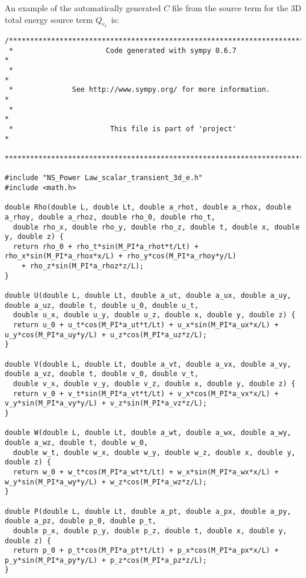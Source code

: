 \documentclass[10pt]{article}
\begin{document}
An example of the automatically generated $C$ file from the source term for the 3D total energy source term $Q_{e_t}$~is:

\begin{footnotesize}
\begin{verbatim}
/****************************************************************************** 
 *                      Code generated with sympy 0.6.7                       * 
 *                                                                            * 
 *              See http://www.sympy.org/ for more information.               * 
 *                                                                            * 
 *                       This file is part of 'project'                       * 
 ******************************************************************************/

#include "NS_Power Law_scalar_transient_3d_e.h"
#include <math.h>

double Rho(double L, double Lt, double a_rhot, double a_rhox, double a_rhoy, double a_rhoz, double rho_0, double rho_t, 
  double rho_x, double rho_y, double rho_z, double t, double x, double y, double z) {
  return rho_0 + rho_t*sin(M_PI*a_rhot*t/Lt) + rho_x*sin(M_PI*a_rhox*x/L) + rho_y*cos(M_PI*a_rhoy*y/L) 
	+ rho_z*sin(M_PI*a_rhoz*z/L);
}

double U(double L, double Lt, double a_ut, double a_ux, double a_uy, double a_uz, double t, double u_0, double u_t, 
  double u_x, double u_y, double u_z, double x, double y, double z) {
  return u_0 + u_t*cos(M_PI*a_ut*t/Lt) + u_x*sin(M_PI*a_ux*x/L) + u_y*cos(M_PI*a_uy*y/L) + u_z*cos(M_PI*a_uz*z/L);
}

double V(double L, double Lt, double a_vt, double a_vx, double a_vy, double a_vz, double t, double v_0, double v_t, 
  double v_x, double v_y, double v_z, double x, double y, double z) {
  return v_0 + v_t*sin(M_PI*a_vt*t/Lt) + v_x*cos(M_PI*a_vx*x/L) + v_y*sin(M_PI*a_vy*y/L) + v_z*sin(M_PI*a_vz*z/L);
}

double W(double L, double Lt, double a_wt, double a_wx, double a_wy, double a_wz, double t, double w_0, 
  double w_t, double w_x, double w_y, double w_z, double x, double y, double z) {
  return w_0 + w_t*cos(M_PI*a_wt*t/Lt) + w_x*sin(M_PI*a_wx*x/L) + w_y*sin(M_PI*a_wy*y/L) + w_z*cos(M_PI*a_wz*z/L);
}

double P(double L, double Lt, double a_pt, double a_px, double a_py, double a_pz, double p_0, double p_t, 
  double p_x, double p_y, double p_z, double t, double x, double y, double z) {
  return p_0 + p_t*cos(M_PI*a_pt*t/Lt) + p_x*cos(M_PI*a_px*x/L) + p_y*sin(M_PI*a_py*y/L) + p_z*cos(M_PI*a_pz*z/L);
}


\end{verbatim}
\end{footnotesize}
\end{document}
